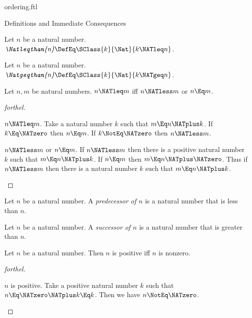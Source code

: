 \documentclass{stex}
\begin{document}
\begin{smodule}{ordering.ftl}
\begin{sfragment}{Definitions and Immediate Consequences}
  \begin{definition}[forthel,for=Natleqthan]
    Let $n$ be a natural number.
    $\emph{\Natleqthan{n}} \DefEq \SClass{k}{\Nat}{k \NATleq n}$.
  \end{definition}

  \begin{definition}[forthel,for=Natgeqthan]
    Let $n$ be a natural number.
    $\emph{\Natgeqthan{n}} \DefEq \SClass{k}{\Nat}{k \NATgeq n }$.
  \end{definition}

  \begin{proposition}[forthel]
    Let $n, m$ be natural numbers.
    $n \NATleq m$ iff $n \NATless m$ or $n \Eq m$.
  \end{proposition}
  \begin{proof}[forthel]
    \begin{case}{$n \NATleq m$.}
      Take a natural number $k$ such that $m \Eq n \NATplus k$.
      If $k \Eq \NATzero$ then $n \Eq m$. If $k \NotEq \NATzero$ then $n \NATless m$.
    \end{case}

    \begin{case}{$n \NATless m$ or $n \Eq m$.}
      If $n \NATless m$ then there is a positive natural number $k$ such that $m \Eq n \NATplus k$.
      If $n \Eq m$ then $m \Eq n \NATplus \NATzero$.
      Thus if $n \NATless m$ then there is a natural number $k$ such that $m \Eq n \NATplus k$.
    \end{case}
  \end{proof}

  \begin{definition}[forthel,for=predecessor]
    Let $n$ be a natural number.
    A \emph{predecessor of $n$} is a natural number that is less than $n$.
  \end{definition}

  \begin{definition}[forthel,for=successor]
    Let $n$ be a natural number.
    A \emph{successor of $n$} is a natural number that is greater than $n$.
  \end{definition}

  \begin{proposition}[forthel]
    Let $n$ be a natural number.
    Then $n$ is positive iff $n$ is nonzero.
  \end{proposition}
  \begin{proof}[forthel]
    \begin{case}{$n$ is positive.}
      Take a positive natural number $k$ such that $n \Eq \NATzero \NATplus k \Eq k$.
      Then we have $n \NotEq \NATzero$.
    \end{case}


\end{proof}
\end{sfragment}
\end{smodule}
\end{document}
